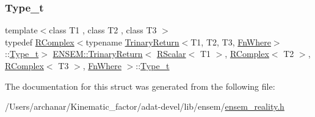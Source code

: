 \subsubsection{\texorpdfstring{Type\_t}{Type\_t}\hspace{0.1cm}{\footnotesize\ttfamily [3/3]}}
{\footnotesize\ttfamily template$<$class T1 , class T2 , class T3 $>$ \\
typedef \mbox{\hyperlink{classENSEM_1_1RComplex}{R\+Complex}}$<$typename \mbox{\hyperlink{structENSEM_1_1TrinaryReturn}{Trinary\+Return}}$<$T1, T2, T3, \mbox{\hyperlink{structENSEM_1_1FnWhere}{Fn\+Where}}$>$\+::\mbox{\hyperlink{structENSEM_1_1TrinaryReturn_3_01RScalar_3_01T1_01_4_00_01RComplex_3_01T2_01_4_00_01RComplex_3_01T3_01_4_00_01FnWhere_01_4_a0ff54f19b5e93daa3871e94f3d83b657}{Type\+\_\+t}}$>$ \mbox{\hyperlink{structENSEM_1_1TrinaryReturn}{E\+N\+S\+E\+M\+::\+Trinary\+Return}}$<$ \mbox{\hyperlink{classENSEM_1_1RScalar}{R\+Scalar}}$<$ T1 $>$, \mbox{\hyperlink{classENSEM_1_1RComplex}{R\+Complex}}$<$ T2 $>$, \mbox{\hyperlink{classENSEM_1_1RComplex}{R\+Complex}}$<$ T3 $>$, \mbox{\hyperlink{structENSEM_1_1FnWhere}{Fn\+Where}} $>$\+::\mbox{\hyperlink{structENSEM_1_1TrinaryReturn_3_01RScalar_3_01T1_01_4_00_01RComplex_3_01T2_01_4_00_01RComplex_3_01T3_01_4_00_01FnWhere_01_4_a0ff54f19b5e93daa3871e94f3d83b657}{Type\+\_\+t}}}



The documentation for this struct was generated from the following file\+:\begin{DoxyCompactItemize}
\item 
/\+Users/archanar/\+Kinematic\+\_\+factor/adat-\/devel/lib/ensem/\mbox{\hyperlink{adat-devel_2lib_2ensem_2ensem__reality_8h}{ensem\+\_\+reality.\+h}}\end{DoxyCompactItemize}
